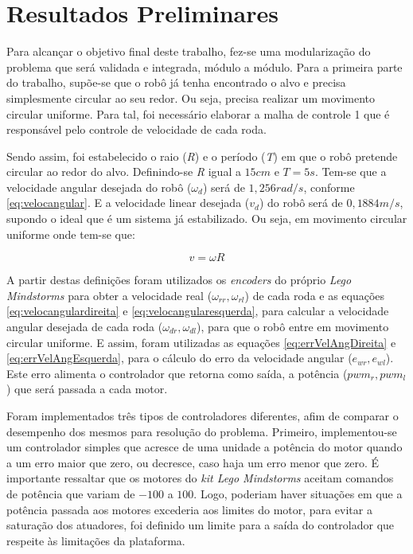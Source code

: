 \chapter{Resultados Preliminares}
\label{chap:resultados}
Para alcançar o objetivo final deste trabalho, fez-se uma modularização do problema que será validada e integrada, módulo a módulo. Para a primeira parte do trabalho, supõe-se que o robô já tenha encontrado o alvo e precisa simplesmente circular ao seu redor. Ou seja, precisa realizar um movimento circular uniforme. Para tal, foi necessário elaborar a malha de controle 1 que é responsável pelo controle de velocidade de cada roda. 

Sendo assim, foi estabelecido o raio (\emph{R}) e o período (\emph{T}) em que o robô pretende circular ao redor do alvo. Definindo-se \emph{R} igual a $15cm$ e $T = 5s$. Tem-se que a velocidade angular desejada do robô ($\omega_{d}$) será de $1,256 rad/s$, conforme \autoref{eq:velocangular}. E a velocidade linear desejada ($v_{d}$) do robô será de $0,1884 m/s$, supondo o ideal que é um sistema já estabilizado. Ou seja, em movimento circular uniforme onde tem-se que: 

\begin{equation}
v = \omega R 
\label{eq:veloclinear}
\end{equation}

A partir destas definições foram utilizados os \emph{encoders} do próprio \emph{Lego Mindstorms} para obter a velocidade real ($\omega_{rr},\omega_{rl}$) de cada roda e as equações \ref{eq:velocangulardireita} e \ref{eq:velocangularesquerda}, para calcular a velocidade angular desejada de cada roda ($\omega_{dr},\omega_{dl}$), para que o robô entre em movimento circular uniforme. E assim, foram utilizadas as equações \ref*{eq:errVelAngDireita} e \ref*{eq:errVelAngEsquerda}, para o cálculo do erro da velocidade angular ($e_{wr},e_{wl}$). Este erro alimenta o controlador que retorna como saída, a potência ($pwm_{r}, pwm_{l}$) que será passada a cada motor.

Foram implementados três tipos de controladores diferentes, afim de comparar o desempenho dos mesmos para resolução do problema. Primeiro, implementou-se um controlador simples que acresce de uma unidade a potência do motor quando a um erro maior que zero, ou decresce, caso haja um erro menor que zero. É importante ressaltar que os motores do \emph{kit Lego Mindstorms} aceitam comandos de potência que variam de $-100$ a $100$. Logo, poderiam haver situações em que a potência passada aos motores excederia aos limites do motor, para evitar a saturação dos atuadores, foi definido um limite para a saída do controlador que respeite às limitações da plataforma.

